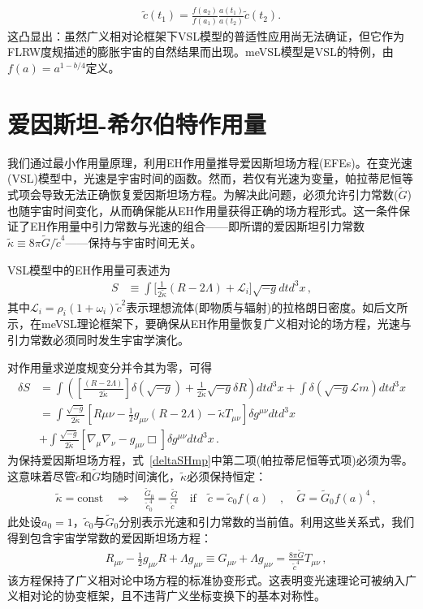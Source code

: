 \documentclass[jkps,preprint,fleqn]{revtex4}
\newcommand{\tc}{\tilde{c}}
\newcommand{\tG}{\tilde{G}}
\newcommand{\tkapp}{\tilde{\kappa}}
\begin{document}
\begin{CJK*}{UTF8}{gbsn}
\begin{align} \tc(t_1) = \frac{f(a_2)}{f(a_1)} \frac{a(t_1)}{a(t_2)} \tc(t_2) \label{cVSL}. \end{align}这凸显出：虽然广义相对论框架下VSL模型的普适性应用尚无法确证，但它作为FLRW度规描述的膨胀宇宙的自然结果而出现。meVSL模型是VSL的特例，由$f(a) = a^{1-b/4}$定义\cite{Lee:2020zts,Lee:2023bjz}。
\section{爱因斯坦-希尔伯特作用量}\label{sec:HEaction}

我们通过最小作用量原理，利用EH作用量推导爱因斯坦场方程(EFEs)。在变光速(VSL)模型中，光速是宇宙时间的函数。然而，若仅有光速为变量，帕拉蒂尼恒等式项会导致无法正确恢复爱因斯坦场方程。为解决此问题，必须允许引力常数($\tG$)也随宇宙时间变化，从而确保能从EH作用量获得正确的场方程形式\cite{Lee:2020zts}。这一条件保证了EH作用量中引力常数与光速的组合——即所谓的爱因斯坦引力常数$\tkapp \equiv 8 \pi \tG/\tc^4$——保持与宇宙时间无关。

VSL模型中的EH作用量可表述为
\begin{align} S &\equiv \int \Biggl[ \frac{1}{2 \tkapp} \left( R - 2 \Lambda \right) + \mathcal{L}_i \Biggr] \sqrt{-g} dt d^3x \label{SHmp} \,, \end{align}
其中$\mathcal{L}_i = \rho_i (1 + \omega_i) \tc^2$表示理想流体(即物质与辐射)的拉格朗日密度。如后文所示，在meVSL理论框架下，要确保从EH作用量恢复广义相对论的场方程，光速与引力常数必须同时发生宇宙学演化。

对作用量求逆度规变分并令其为零，可得
\begin{align} \delta S &= \int \left( \left[ \frac{\left( R - 2 \Lambda \right)}{2 \tkapp} \right] \delta \left( \sqrt{-g} \right)  + \frac{1}{2\tkapp} \sqrt{-g} \delta R \right) dt d^3 x + \int \delta \left( \sqrt{-g} \mathcal{L}{m} \right) dt d^3 x \nonumber \\ &= \int \frac{\sqrt{-g}}{2 \tkapp} \left[ R{\mu\nu} - \frac{1}{2} g_{\mu\nu} \left( R - 2 \Lambda \right) - \tkapp T_{\mu\nu} \right] \delta g^{\mu\nu} dtd^3 x \nonumber \\ &+ \int \frac{\sqrt{-g}}{2 \tkapp} \left[ \nabla_{\mu} \nabla_{\nu} - g_{\mu\nu} \Box \right] \delta g^{\mu\nu} dtd^3 x \label{deltaSHmp} \,. \end{align}
为保持爱因斯坦场方程，式~\eqref{deltaSHmp}中第二项(帕拉蒂尼恒等式项)必须为零。这意味着尽管$\tc$和$\tG$均随时间演化，$\tkapp$必须保持恒定：
\begin{align}
&\tkapp = \text{const} \quad \Rightarrow \quad \frac{\tG_0}{\tc_0^4} = \frac{\tG}{\tc^4} \quad \textrm{if} \quad \tc = \tc_0 f(a) \quad , \quad \tG = \tG_{0} f(a)^4 \label{tkappaconstmp} \,,
\end{align}
此处设$a_0 = 1$，$\tc_0$与$\tG_0$分别表示光速和引力常数的当前值。利用这些关系式，我们得到包含宇宙学常数的爱因斯坦场方程：
\begin{align} &R_{\mu\nu} - \frac{1}{2} g_{\mu\nu} R + \Lambda g_{\mu\nu} \equiv G_{\mu\nu} + \Lambda g_{\mu\nu}  = \frac{8 \pi \tG}{\tc^4} T_{\mu\nu} \label{tEFEmp} \,, \end{align}
该方程保持了广义相对论中场方程的标准协变形式。这表明变光速理论可被纳入广义相对论的协变框架，且不违背广义坐标变换下的基本对称性。

\end{CJK*}
\end{document}
